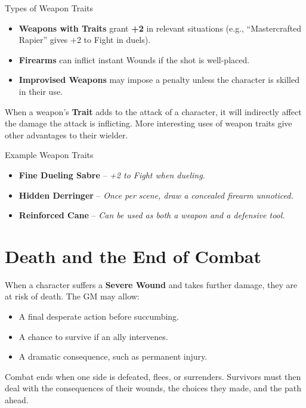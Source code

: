 \begin{DndReadAloud}{Types of Weapon Traits}
\begin{itemize}
    \item \textbf{Weapons with Traits} grant \textbf{+2} in relevant situations (e.g., “Mastercrafted Rapier” gives +2 to Fight in duels).
    \item \textbf{Firearms} can inflict instant Wounds if the shot is well-placed.
    \item \textbf{Improvised Weapons} may impose a penalty unless the character is skilled in their use.
\end{itemize}
\end{DndReadAloud}

When a weapon's \textbf{Trait} adds to the attack of a character, it will indirectly affect the damage the attack is inflicting. More interesting uses of weapon traits give other advantages to their wielder.

\begin{DndReadAloud}{Example Weapon Traits}
\begin{itemize}
    \item \textbf{Fine Dueling Sabre} – \textit{+2 to Fight when dueling.}
    \item \textbf{Hidden Derringer} – \textit{Once per scene, draw a concealed firearm unnoticed.}
    \item \textbf{Reinforced Cane} – \textit{Can be used as both a weapon and a defensive tool.}
\end{itemize}
\end{DndReadAloud}

\section{Death and the End of Combat}
When a character suffers a \textbf{Severe Wound} and takes further damage, they are at risk of death. The GM may allow:
\begin{itemize}
    \item A final desperate action before succumbing.
    \item A chance to survive if an ally intervenes.
    \item A dramatic consequence, such as permanent injury.
\end{itemize}

Combat ends when one side is defeated, flees, or surrenders. Survivors must then deal with the consequences of their wounds, the choices they made, and the path ahead.

